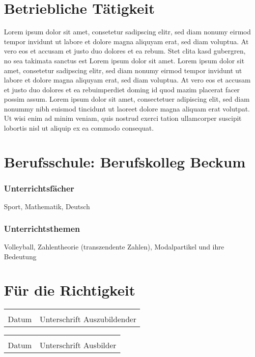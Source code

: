\documentclass[11pt,a4paper]{article}
\author{Gustav Tester} %
\begin{document}
\section*{Betriebliche Tätigkeit} %
Lorem ipsum dolor sit amet, consetetur sadipscing elitr, sed diam nonumy eirmod tempor invidunt ut labore et dolore magna aliquyam erat, sed diam voluptua. At vero eos et accusam et justo duo dolores et ea rebum. Stet clita kasd gubergren, no sea takimata sanctus est Lorem ipsum dolor sit amet. Lorem ipsum dolor sit amet, consetetur sadipscing elitr, sed diam nonumy eirmod tempor invidunt ut labore et dolore magna aliquyam erat, sed diam voluptua. At vero eos et accusam et justo duo dolores et ea rebuimperdiet doming id quod mazim placerat facer possim assum. Lorem ipsum dolor sit amet, consectetuer adipiscing elit, sed diam nonummy nibh euismod tincidunt ut laoreet dolore magna aliquam erat volutpat. Ut wisi enim ad minim veniam, quis nostrud exerci tation ullamcorper suscipit lobortis nisl ut aliquip ex ea commodo consequat.


\section*{Berufsschule: Berufskolleg Beckum}
\begin{multicols}{2}
	\subsubsection*{Unterrichtsfächer}
	Sport, Mathematik, Deutsch
	\columnbreak
	\subsubsection*{Unterrichtsthemen}
	Volleyball, Zahlentheorie (transzendente Zahlen), Modalpartikel und ihre Bedeutung
\end{multicols}

\vfill
\setlength{\parindent}{0cm}
\section*{Für die Richtigkeit}
\vspace{.5cm}
\begin{multicols}{2}
	\begin{tabular}{@{}p{2cm}p{5cm}@{}}
		\hrulefill & \hrulefill\\
		Datum & Unterschrift Auszubildender
	\end{tabular}
	\vfill\null
	\columnbreak
	\begin{tabular}{@{}p{2cm}p{5cm}@{}}
		\hrulefill & \hrulefill\\
		Datum & Unterschrift Ausbilder
	\end{tabular}
\end{multicols}
	
\end{document}
